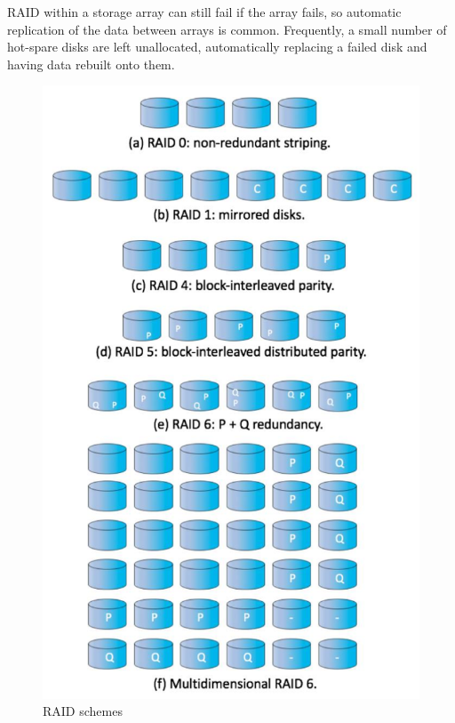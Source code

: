 RAID within a storage array can still fail if the array fails, so
automatic replication of the data between arrays is common. Frequently, a small number of hot-spare disks are left
unallocated, automatically replacing a failed disk and having data
rebuilt onto them.


\begin{figure}[h!]
    \begin{minipage}[h!]{0.5\textwidth}
        \centering
        \includegraphics[width=1\linewidth]{img/zmfdg.png}
    \caption{RAID schemes}
    \end{minipage}
    \begin{minipage}[h!]{0.5\textwidth}

\end{minipage}
\end{figure}
